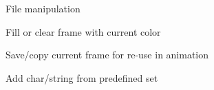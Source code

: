 \documentclass[11pt]{article} %
\begin{document}
\begin{figure}[H]
	\centering
	\caption{File manipulation}
	\label{fig:UC1}
\end{figure}
\begin{figure}[H]
	\centering
	\caption{Fill or clear frame with current color}
	\label{fig:UC2}
\end{figure}
\begin{figure}[H]
	\centering
	\caption{Save/copy current frame for re-use in animation}
	\label{fig:UC3}
\end{figure}

\begin{figure}[H]
	\centering
	\caption{Add char/string from predefined set}
	\label{fig:UC4}
\end{figure}
\end{document}
